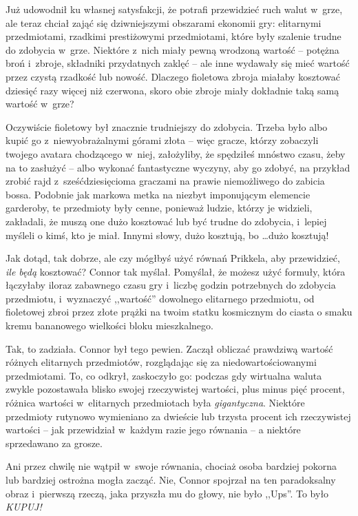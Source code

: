 \documentclass[oneside,polish,11pt,rmheadings]{mwbk}
\begin{document}
Już udowodnił ku własnej satysfakcji, że potrafi przewidzieć ruch walut w~grze, ale teraz chciał zająć się dziwniejszymi obszarami ekonomii gry: elitarnymi przedmiotami, rzadkimi prestiżowymi przedmiotami, które były szalenie trudne do zdobycia w~grze. Niektóre z~nich miały pewną wrodzoną wartość -- potężna broń i~zbroje, składniki przydatnych zaklęć -- ale inne wydawały się mieć wartość przez czystą rzadkość lub nowość. Dlaczego fioletowa zbroja miałaby kosztować dziesięć razy więcej niż czerwona, skoro obie zbroje miały dokładnie taką samą wartość w~grze?

Oczywiście fioletowy był znacznie trudniejszy do zdobycia. Trzeba było albo kupić go z~niewyobrażalnymi górami złota -- więc gracze, którzy zobaczyli twojego avatara chodzącego w~niej, założyliby, że spędziłeś mnóstwo czasu, żeby na to zasłużyć -- albo wykonać fantastyczne wyczyny, aby go zdobyć, na przykład zrobić rajd z~sześćdziesięcioma graczami na prawie niemożliwego do zabicia bossa. Podobnie jak markowa metka na niezbyt imponującym elemencie garderoby, te przedmioty były cenne, ponieważ ludzie, którzy je widzieli, zakładali, że muszą one dużo kosztować lub być trudne do zdobycia, i~lepiej myśleli o kimś, kto je miał. Innymi słowy, dużo kosztują, bo \ldots  dużo kosztują!

Jak dotąd, tak dobrze, ale czy mógłbyś użyć równań Prikkela, aby przewidzieć, \textit{ile będą} kosztować? Connor tak myślał. Pomyślał, że możesz użyć formuły, która łączyłaby iloraz zabawnego czasu gry i~liczbę godzin potrzebnych do zdobycia przedmiotu, i~wyznaczyć ,,wartość'' dowolnego elitarnego przedmiotu, od fioletowej zbroi przez złote prążki na twoim statku kosmicznym do ciasta o smaku kremu bananowego wielkości bloku mieszkalnego.

Tak, to zadziała. Connor był tego pewien. Zaczął obliczać prawdziwą wartość różnych elitarnych przedmiotów, rozglądając się za niedowartościowanymi przedmiotami. To, co odkrył, zaskoczyło go: podczas gdy wirtualna waluta zwykle pozostawała blisko swojej rzeczywistej wartości, plus minus pięć procent, różnica wartości w~elitarnych przedmiotach była \textit{gigantyczna}. Niektóre przedmioty rutynowo wymieniano za dwieście lub trzysta procent ich rzeczywistej wartości -- jak przewidział w~każdym razie jego równania -- a niektóre sprzedawano za grosze.

Ani przez chwilę nie wątpił w~swoje równania, chociaż osoba bardziej pokorna lub bardziej ostrożna mogła zacząć. Nie, Connor spojrzał na ten paradoksalny obraz i~pierwszą rzeczą, jaka przyszła mu do głowy, nie było ,,Ups''. To było \textit{KUPUJ!}
\end{document}
